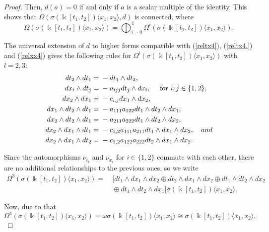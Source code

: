 \documentclass{amsart}
\theoremstyle{definition}
\theoremstyle{remark}
\numberwithin{equation}{section}
\begin{document}
\begin{proof}
Then, $d(a)=0$ if and only if $a$ is a scalar multiple of the identity. This shows that $\Omega(\sigma(\Bbbk[t_1, t_2])\langle x_1, x_2\rangle,d)$ is connected, where 
\[
\Omega(\sigma(\Bbbk[t_1, t_2])\langle x_1, x_2\rangle) = \bigoplus_{i=0}^{4}\Omega^i(\sigma(\Bbbk[t_1, t_2])\langle x_1, x_2\rangle).
\]

The universal extension of $d$ to higher forms compatible with {\rm (}\ref{reltx4}{\rm )}, {\rm (}\ref{reltx4.}{\rm )} and {\rm (}\ref{relxx4}{\rm )} gives the following rules for $\Omega^l(\sigma(\Bbbk[t_1, t_2])\langle x_1, x_2\rangle)$ with $l = 2, 3$:
\begin{align}\label{rel3wedge22}
 dt_2 \wedge dt_1  = &\ - dt_1 \wedge dt_2, \\
 dx_i\wedge dt_j = &\ -a_{ijj}dt_j\wedge dx_i, \quad \text{ for } i, j \in \{1, 2\}, \notag \\
 dx_2\wedge dx_1 = &\ -c_{i,j}dx_1\wedge dx_2,  \notag \\
dx_1\wedge dt_2\wedge dt_1 = &\ -a_{111}a_{122}dt_1\wedge dt_2\wedge dx_1,  \\
dx_2\wedge dt_2\wedge dt_1 = &\ -a_{211}a_{222}dt_1\wedge dt_2\wedge dx_2, \notag  \\
dx_2\wedge dx_1\wedge dt_1 = &\ -c_{1,2}a_{111}a_{211}dt_1\wedge dx_1\wedge dx_2, \quad {\rm and} \notag \\
dx_2\wedge dx_1\wedge dt_2 = &\  -c_{1,2}a_{122}a_{222}dt_2\wedge dx_1\wedge dx_2. \notag
\end{align}

Since the automorphisms $\nu_{t_i}$ and $\nu_{x_i}$ for $i \in \{1, 2\}$ commute with each other, there are no additional relationships to the previous ones, so we write
\begin{align*}
\Omega^{3}(\sigma(\Bbbk[t_1, t_2])\langle x_1, x_2\rangle) = &\ [dt_1\wedge dx_1\wedge dx_2 \oplus dt_2\wedge dx_1\wedge dx_2 \oplus dt_1\wedge dt_2\wedge dx_2 \\
&\ \oplus dt_1\wedge dt_2\wedge dx_1] \sigma(\Bbbk[t_1, t_2])\langle x_1, x_2\rangle.
\end{align*}

Now, due to that 
$$
\Omega^4(\sigma(\Bbbk[t_1, t_2])\langle x_1, x_2\rangle) = \omega\sigma(\Bbbk[t_1, t_2])\langle x_1, x_2\rangle\cong \sigma(\Bbbk[t_1, t_2])\langle x_1, x_2\rangle,
$$ 


\end{proof}
\end{document}

